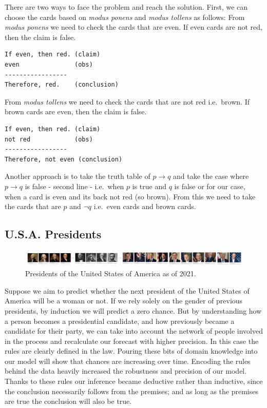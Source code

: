 \documentclass[
]{book}
\begin{document}
There are two ways to face the problem and reach the solution. First, we can choose the cards based on \emph{modus ponens} and \emph{modus tollens} as follows: From \emph{modus ponens} we need to check the cards that are even. If even cards are not red, then the claim is false.

\begin{verbatim}
If even, then red. (claim)
even               (obs)
-----------------
Therefore, red.    (conclusion)
\end{verbatim}

From \emph{modus tollens} we need to check the cards that are not red i.e.~brown. If brown cards are even, then the claim is false.

\begin{verbatim}
If even, then red. (claim)
not red            (obs)
-----------------
Therefore, not even (conclusion)
\end{verbatim}

Another approach is to take the truth table of \(p \rightarrow q\) and take the case where \(p \rightarrow q\) is false - second line - i.e.~when \(p\) is true and \(q\) is false or for our case, when a card is even and its back not red (so brown). From this we need to take the cards that are \(p\) and \(\lnot q\) i.e.~even cards and brown cards.

\hypertarget{u.s.a.-presidents}{%
\subsection{U.S.A. Presidents}\label{u.s.a.-presidents}}

\begin{figure}

{\centering \includegraphics[width=1\linewidth]{Figures/usa_presidents} 

}

\caption{Presidents of the United States of America as of 2021.}\label{fig:us-presidents}
\end{figure}

Suppose we aim to predict whether the next president of the United States of America will be a woman or not. If we rely solely on the gender of previous presidents, by induction we will predict a zero chance. But by understanding how a person becomes a presidential candidate, and how previously became a candidate for their party, we can take into account the network of people involved in the process and recalculate our forecast with higher precision. In this case the rules are clearly defined in the law. Pouring these bits of domain knowledge into our model will show that chances are increasing over time. Encoding the rules behind the data heavily increased the robustness and precision of our model. Thanks to these rules our inference became deductive rather than inductive, since the conclusion necessarily follows from the premises; and as long as the premises are true the conclusion will also be true.
\end{document}
